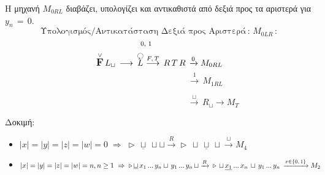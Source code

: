 \par Η μηχανή $M_{0RL}$ διαβάζει, υπολογίζει και αντικαθιστά από δεξιά προς τα αριστερά για $y_n\,=\,0$.
\[\text{Υπολογισμός/Αντικατάσταση Δεξιά προς Αριστερά}\,:\, M_{0LR}\,:\]
\[{\text{\scriptsize 0, 1}}\qquad\quad\]
\reducevspace\reducevspace\reducevspace\reducevspace\reducevspace\reducevspace\reducevspace\reducevspace
\reducevspace\reducevspace\reducevspace\reducevspace\reducevspace\reducevspace\reducevspace\reducevspace
\reducevspace\reducevspace\reducevspace\reducevspace\reducevspace\reducevspace\reducevspace\reducevspace
\reducevspace\reducevspace\reducevspace\reducevspace\reducevspace\reducevspace\reducevspace\reducevspace
\[\overset{\lor}{{\text{\large\bfseries F}}}\,L_\sqcup\, \longrightarrow\, \overset{\botcircleleft}{L}
\overset{F,\,T}{\longrightarrow}\, R\,T\,R\,\xrightarrow{0} M_{0RL}\]
\reducevspace\reducevspace\reducevspace\reducevspace\reducevspace\reducevspace\reducevspace
\reducevspace\reducevspace\reducevspace\reducevspace\reducevspace\reducevspace\reducevspace
\reducevspace\reducevspace\reducevspace\reducevspace\reducevspace\reducevspace\reducevspace
\reducevspace\reducevspace\reducevspace\reducevspace\reducevspace\reducevspace\reducevspace
\[\qquad\qquad\qquad\qquad\qquad\;\;\,\xrightarrow{1}\, M_{1RL}\]

\reducevspace\reducevspace\reducevspace\reducevspace\reducevspace\reducevspace\reducevspace\reducevspace\reducevspace
\reducevspace\reducevspace\reducevspace\reducevspace\reducevspace\reducevspace\reducevspace\reducevspace\reducevspace
\reducevspace\reducevspace\reducevspace\reducevspace\reducevspace\reducevspace\reducevspace\reducevspace\reducevspace
\reducevspace\reducevspace\reducevspace\reducevspace\reducevspace\reducevspace\reducevspace\reducevspace\reducevspace
\[\qquad\qquad\qquad\qquad\qquad\qquad\;\;\xrightarrow{\sqcup}\, R_\sqcup \rightarrow M_T\]
\par Δοκιμή:
\begin{itemize}
	\itemsep0em
	\item $|x| = |y| = |z| = |w| = 0 \;\Rightarrow\;\triangleright\, \underline{\sqcup}\, \sqcup \sqcup
	\xrightarrow{R} \triangleright\, \sqcup\, \underline{\sqcup}\, \sqcup \xrightarrow{\sqcup} M_4 \quad$
	\textcolor{green}{}

	\item $|x| = |y| = |z| = |w| = n, n \geq 1 \;\Rightarrow\;\triangleright\, \underline{\sqcup}\, x_1\,...\,y_n
	\sqcup\, y_1\,...\,y_n\, \sqcup \xrightarrow{R}\\ \triangleright\, \sqcup\, \underline{x_1}\,...\,x_n\,
	\sqcup\,
	y_1\,...\,y_n\, \xrightarrow{x \in \{0,\,1\}} M_2 \quad$
	\textcolor{green}{}
\end{itemize}




